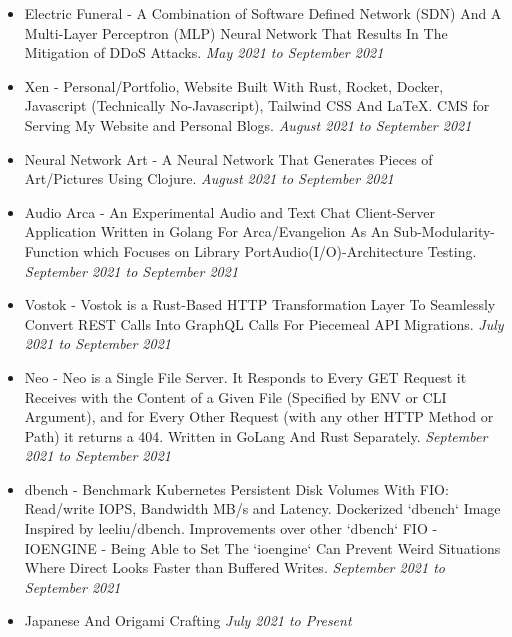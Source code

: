 \documentclass{myresume}
\begin{document}
       \begin{itemize}
     	\item Electric Funeral - A Combination of Software Defined Network (SDN) And A Multi-Layer Perceptron (MLP) Neural Network That Results In The Mitigation of DDoS Attacks. \textit{May 2021 to September 2021}
     	\item Xen - Personal/Portfolio, Website Built With Rust, Rocket, Docker, Javascript (Technically No-Javascript), Tailwind CSS And \LaTeX{}. CMS for Serving My Website and Personal Blogs. \textit{August 2021 to September 2021}
     	\item Neural Network Art -  A Neural Network That Generates Pieces of Art/Pictures Using Clojure. \textit{August 2021 to September 2021}
     	\item Audio Arca - An Experimental Audio and Text Chat Client-Server Application Written in Golang For Arca/Evangelion As An Sub-Modularity-Function which Focuses on Library PortAudio(I/O)-Architecture Testing. \textit{September 2021 to September 2021}
     	\item Vostok - Vostok is a Rust-Based HTTP Transformation Layer To Seamlessly Convert REST Calls Into GraphQL Calls For Piecemeal API Migrations. \textit {July 2021 to September 2021}
     	\item Neo - Neo is a Single File Server. It Responds to Every GET Request it Receives with the Content of a Given File (Specified by ENV or CLI Argument), and for Every Other Request (with any other HTTP Method or Path) it returns a 404. Written in GoLang And Rust Separately. \textit {September 2021 to September 2021}
     	\item dbench - Benchmark Kubernetes Persistent Disk Volumes With FIO: Read/write IOPS, Bandwidth MB/s and Latency. Dockerized `dbench` Image Inspired by leeliu/dbench. Improvements over other `dbench` FIO - IOENGINE - Being Able to Set The `ioengine` Can Prevent Weird Situations Where Direct Looks Faster than Buffered Writes. \textit{September 2021 to September 2021}    	
       \end{itemize}   
 
        \begin{itemize}
                \item Japanese And Origami Crafting \textit{July 2021 to Present}
        \end{itemize}
\end{document}
